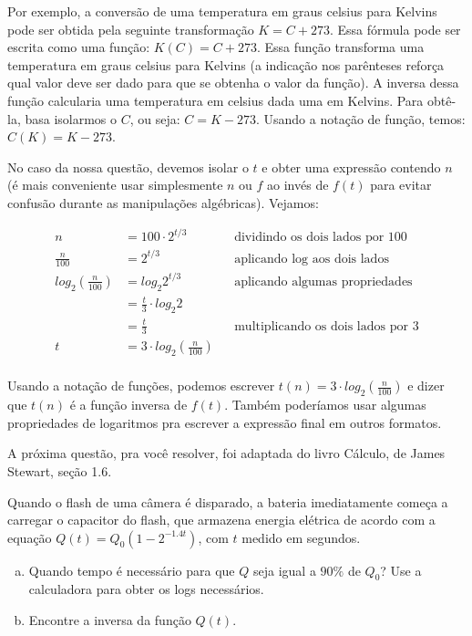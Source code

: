 \documentclass[main_estudante.tex]{subfiles}
\begin{document}
Por exemplo, a conversão de uma temperatura em graus celsius para Kelvins pode ser obtida pela seguinte transformação $K=C+273$. Essa fórmula pode ser escrita como uma função: $K(C)=C+273$. Essa função transforma uma temperatura em graus celsius para Kelvins (a indicação nos parênteses reforça qual valor deve ser dado para que se obtenha o valor da função). A inversa dessa função calcularia uma temperatura em celsius dada uma em Kelvins. Para obtê-la, basa isolarmos o $C$, ou seja: $C=K-273$. Usando a notação de função, temos: $C(K)=K-273$.

No caso da nossa questão, devemos isolar o $t$ e obter uma expressão contendo $n$ (é mais conveniente usar simplesmente $n$ ou $f$ ao invés de $f(t)$ para evitar confusão durante as manipulações algébricas). Vejamos:

\begin{align*}
n & {} = 100 \cdot 2^{t/3} && \text{dividindo os dois lados por 100}\\
\frac{n}{100} & {} = 2^{t/3} && \text{aplicando log aos dois lados} \\
log_2 (\frac{n}{100}) & {} = log_2 2^{t/3} && \text{aplicando algumas propriedades} \\
 & {} = \frac{t}{3} \cdot log_2 2 \\
 & {} = \frac{t}{3} && \text{multiplicando os dois lados por 3}\\
t & {} = 3 \cdot log_2 (\frac{n}{100}) \\
\end{align*}

Usando a notação de funções, podemos escrever $t(n) = 3 \cdot log_2 (\frac{n}{100})$ e dizer que $t(n)$ é a função inversa de $f(t)$. Também poderíamos usar algumas propriedades de logaritmos pra escrever a expressão final em outros formatos.

A próxima questão, pra você resolver, foi adaptada do livro Cálculo, de James Stewart, seção 1.6.

\begin{resolva}
Quando o flash de uma câmera é disparado, a bateria imediatamente começa a carregar o capacitor do flash, que armazena energia elétrica de acordo com a equação $Q(t)=Q_0(1-2^{-1.4t})$, com $t$ medido em segundos.
\begin{enumerate}[a)]
 \item Quando tempo é necessário para que $Q$ seja igual a $90\%$ de $Q_0$? Use a calculadora para obter os logs necessários.
 \item Encontre a inversa da função $Q(t)$.
\end{enumerate}
\end{resolva}
\end{document}
